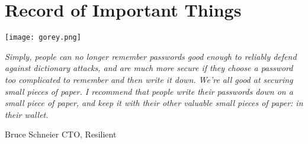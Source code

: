 \documentclass[12pt]{memoir}
\begin{document}



\newpage

\chapter*{Record of Important Things}

\begin{center}
	\texttt{[image: gorey.png]}
\end{center}

\begin{small}
\textit{Simply, people can no longer remember passwords good enough to reliably defend against dictionary attacks, and are much more secure if they choose a password too complicated to remember and then write it down. We're all good at securing small pieces of paper. I recommend that people write their passwords down on a small piece of paper, and keep it with their other valuable small pieces of paper: in their wallet.}
\begin{flushright}{Bruce Schneier CTO, Resilient}\end{flushright}
\end{small}



\clearpage
{}



























































\newpage
\fontsize{7}{8}\selectfont
\begin{multicols}{4}
	\noindent
\end{multicols}
\small




\end{document}
